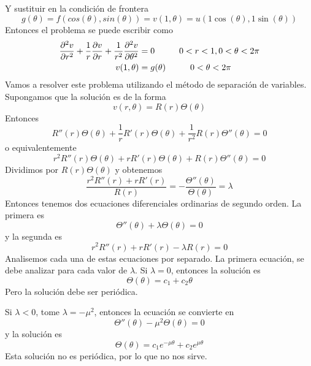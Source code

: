 \documentclass[11pt]{book}
\theoremstyle{plain}
\theoremstyle{definition}
\begin{document}
    Y sustituir en la condición de frontera
    \[
        g(\theta) = f(cos(\theta), sin(\theta)) = v(1,\theta) = u(1\cos(\theta), 1\sin(\theta))
    \]
    Entonces el problema se puede escribir como
    \begin{align*}
        \frac{\partial^{2}v}{\partial r^{2}} + \frac{1}{r}\frac{\partial v}{\partial r} + \frac{1}{r^{2}}\frac{\partial^{2}v}{\partial \theta^{2}} &= 0 \hspace{10mm} 0<r<1, 0<\theta<2\pi\\
        v(1,\theta) &= g(\theta) \hspace{10mm} 0<\theta<2\pi
    \end{align*}
    Vamos a resolver este problema utilizando el método de separación de variables. Supongamos que la solución es de la forma
    \[
        v(r,\theta) = R(r)\Theta(\theta)
    \]
    Entonces
    \[
        R''(r)\Theta(\theta) + \frac{1}{r}R'(r)\Theta(\theta) + \frac{1}{r^{2}}R(r)\Theta''(\theta) = 0
    \]
    o equivalentemente
    \[
        r^{2}R''(r)\Theta(\theta) + rR'(r)\Theta(\theta) + R(r)\Theta''(\theta) = 0
    \]
    Dividimos por $R(r)\Theta(\theta)$ y obtenemos
    \[
        \frac{r^{2}R''(r) + rR'(r)}{R(r)} = -\frac{\Theta''(\theta)}{\Theta(\theta)} = \lambda
    \]
    Entonces tenemos dos ecuaciones diferenciales ordinarias de segundo orden. La primera es
    \[
        \Theta''(\theta) + \lambda\Theta(\theta) = 0
    \]
    y la segunda es
    \[
        r^{2}R''(r) + rR'(r) - \lambda R(r) = 0
    \]
    Analisemos cada una de estas ecuaciones por separado. La primera ecuación, se debe analizar para cada valor de $\lambda$. Si $\lambda = 0$, entonces la solución es
    \[
        \Theta(\theta) = c_{1} + c_{2}\theta
    \]
    Pero la solución debe ser periódica.

    Si $\lambda < 0$, tome $\lambda = -\mu^{2}$, entonces la ecuación se convierte en
    \[
        \Theta''(\theta) - \mu^{2}\Theta(\theta) = 0
    \]
    y la solución es
    \[
        \Theta(\theta) = c_{1}e^{-\mu\theta} + c_{2}e^{\mu\theta}
    \]
    Esta solución no es periódica, por lo que no nos sirve.
\end{document}
